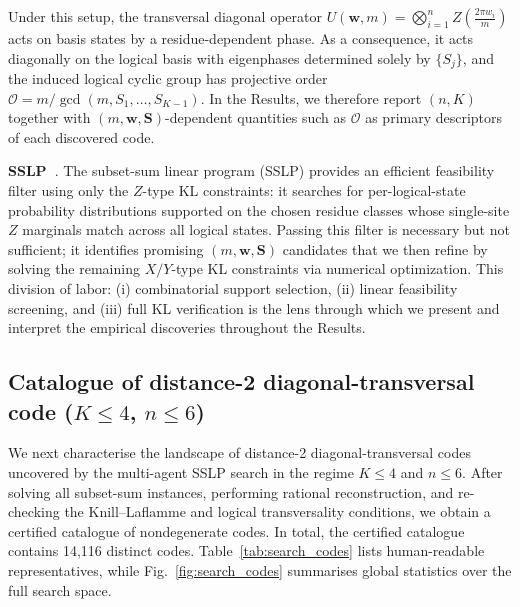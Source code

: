 \documentclass[pdflatex,sn-nature]{sn-jnl}%
\theoremstyle{thmstyleone}%
\theoremstyle{thmstyletwo}%
\theoremstyle{thmstylethree}%
\begin{document}
Under this setup, the transversal diagonal operator $U(\mathbf w,m)=\bigotimes_{i=1}^n Z\!\left(\tfrac{2\pi w_i}{m}\right)$
acts on basis states by a residue-dependent phase.
As a consequence, it acts diagonally on the logical basis with eigenphases determined solely by $\{S_j\}$, and the induced logical cyclic group has projective order
$\mathcal{O}=m/\gcd(m,S_1,\dots,S_{K-1})$.
In the Results, we therefore report $(n,K)$ together with $(m,\mathbf w,\mathbf S)$-dependent quantities such as $\mathcal{O}$ as primary descriptors of each discovered code.

\textbf{SSLP~\cite{Zhang2025Transversal}}.
The subset-sum linear program (SSLP) provides an efficient feasibility filter using only the $Z$-type KL constraints: it searches for per-logical-state probability distributions supported on the chosen residue classes whose single-site $Z$ marginals match across all logical states.
Passing this filter is necessary but not sufficient; it identifies promising $(m,\mathbf w,\mathbf S)$ candidates that we then refine by solving the remaining $X/Y$-type KL constraints via numerical optimization.
This division of labor: (i) combinatorial support selection, (ii) linear feasibility screening, and (iii) full KL verification is the lens through which we present and interpret the empirical discoveries throughout the Results.

\subsection{Catalogue of distance-2 diagonal-transversal code ($K \leq 4$, $n \leq 6$)}
\label{subsec:catalogue}

We next characterise the landscape of distance-2 diagonal-transversal codes uncovered by the multi-agent SSLP search in the regime $K\leq 4$ and $n\leq 6$. After solving all subset-sum instances, performing rational reconstruction, and re-checking the Knill–Laflamme and logical transversality conditions, we obtain a certified catalogue of nondegenerate codes. In total, the certified catalogue contains 14,116 distinct codes. Table~\ref{tab:search_codes} lists human-readable representatives, while Fig.~\ref{fig:search_codes} summarises global statistics over the full search space.
\end{document}
